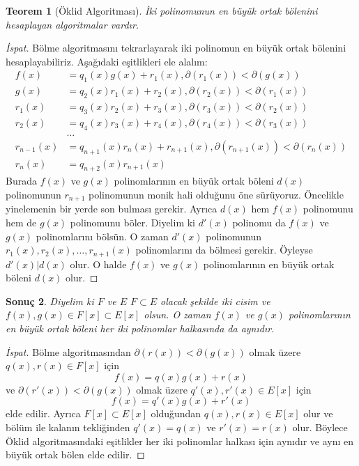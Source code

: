 \documentclass{article}
\newtheorem{thm}{Teorem}[section]
\newtheorem{cor}[thm]{Sonuç}
\theoremstyle{definition}
\theoremstyle{remark}
\begin{document}
    		\begin{thm}[Öklid Algoritması]
    		    İki polinomunun en büyük ortak bölenini hesaplayan algoritmalar vardır.
		    \end{thm}
		    
		    \begin{proof}[İspat]
		        Bölme algoritmasını tekrarlayarak iki polinomun en büyük ortak bölenini hesaplayabiliriz. Aşağıdaki eşitlikleri ele alalım:
		        \begin{align*}
		            f(x) &= q_1(x)g(x) + r_1(x), \partial(r_1(x)) < \partial(g(x))\\
		            g(x) &= q_2(x)r_1(x) + r_2(x), \partial(r_2(x)) < \partial(r_1(x))\\
		            r_1(x) &= q_3(x)r_2(x) + r_3(x), \partial(r_3(x)) < \partial(r_2(x))\\
		            r_2(x) &= q_4(x)r_3(x) + r_4(x), \partial(r_4(x)) < \partial(r_3(x))\\
		            &\dots\\
		            r_{n - 1}(x) &= q_{n + 1}(x)r_n(x) + r_{n + 1}(x), \partial(r_{n + 1}(x)) < \partial(r_n(x))\\
		            r_n(x) &= q_{n + 2}(x)r_{n + 1}(x)
		        \end{align*}
		        Burada $f(x)$ ve $g(x)$ polinomlarının en büyük ortak böleni $d(x)$ polinomunun $r_{n + 1}$ polinomunun monik hali olduğunu öne sürüyoruz. Öncelikle yinelemenin bir yerde son bulması gerekir. Ayrıca $d(x)$ hem $f(x)$ polinomunu hem de $g(x)$ polinomunu böler. Diyelim ki $d'(x)$ polinomu da $f(x)$ ve $g(x)$ polinomlarını bölsün. O zaman $d'(x)$ polinomunun $r_1(x), r_2(x), \dots, r_{n + 1}(x)$ polinomlarını da bölmesi gerekir. Öyleyse $d'(x) | d(x)$ olur. O halde $f(x)$ ve $g(x)$ polinomlarının en büyük ortak böleni $d(x)$ olur.
		    \end{proof}
		    
		    \begin{cor}\label{2.8}
		        Diyelim ki $F$ ve $E$ $F \subset E$ olacak şekilde iki cisim ve $f(x), g(x) \in F[x] \subset E[x]$ olsun. O zaman $f(x)$ ve $g(x)$ polinomlarının en büyük ortak böleni her iki polinomlar halkasında da aynıdır.
		    \end{cor}
		    
		    \begin{proof}[İspat]
		        Bölme algoritmasından $\partial(r(x)) < \partial(g(x))$ olmak üzere $q(x), r(x) \in F[x]$ için
		        \begin{equation*}
		            f(x) = q(x)g(x) + r(x)
		        \end{equation*}
		        ve $\partial(r'(x)) < \partial(g(x))$ olmak üzere $q'(x), r'(x) \in E[x]$ için
		        \begin{equation*}
		            f(x) = q'(x)g(x) + r'(x)
		        \end{equation*}
		        elde edilir. Ayrıca $F[x] \subset E[x]$ olduğundan $q(x), r(x) \in E[x]$ olur ve bölüm ile kalanın tekliğinden $q'(x) = q(x)$ ve $r'(x) = r(x)$ olur. Böylece Öklid algoritmasındaki eşitlikler her iki polinomlar halkası için aynıdır ve aynı en büyük ortak bölen elde edilir.
		    \end{proof}
		    
\end{document}
